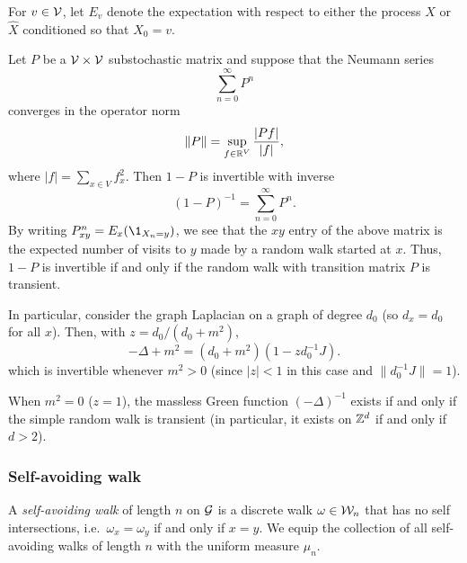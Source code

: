 For $v \in \mathcal{V}$, let $E_v$ denote the expectation
with respect to either the process $X$ or $\hat X$ conditioned so that $X_0 = v$.

\begin{example}
Let $P$ be a $\mathcal{V} \times \mathcal{V}$ substochastic matrix and suppose that the Neumann series
\begin{equation}
\sum_{n=0}^\infty P^n
\end{equation}
converges in the operator norm
\begin{equation}
\|P\| = \sup_{f \in {\mathbb R}^V} \frac{|P f|}{|f|},
\end{equation}
where $|f| = \sum_{x\in V} f_x^2$. Then $1 - P$ is invertible with inverse
\begin{equation}
(1 - P)^{-1} = \sum_{n=0}^\infty P^n.
\end{equation}
By writing $P^n_{xy} = E_x( \1_{X_n=y})$, we see that the $xy$ entry of the
above matrix is the expected number of visits to $y$ made by a random walk
started at $x$. Thus, $1 - P$ is invertible if and only if the random walk
with transition matrix $P$ is transient. 

In particular, consider the graph Laplacian on a graph of degree $d_0$
(so $d_x = d_0$ for all $x$).
Then, with  $z = d_0 / (d_0 + m^2)$,
\begin{equation}
-\Delta + m^2 = (d_0 + m^2) (1 - z d_0^{-1} J).
\end{equation}
which is invertible whenever $m^2 > 0$ (since $|z| < 1$ in this case and $\|d_0^{-1} J\| = 1$).

When $m^2 = 0$ ($z = 1$), the massless Green function $(-\Delta)^{-1}$
exists if and only if the simple random walk is transient (in particular, it exists on
${ {{\mathbb Z}}^d }$ if and only if $d > 2$).
\end{example}


\subsubsection{Self-avoiding walk}

A \emph{self-avoiding walk} of length $n$ on $\mathcal{G}$ is a discrete walk $\omega\in\mathcal{W}_n$
that has no self intersections, i.e.\ $\omega_x = \omega_y$ if and only if $x = y$.
We equip the collection of all self-avoiding walks of length $n$ with the uniform measure $\mu_n$.

